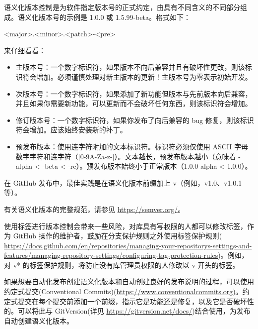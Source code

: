 语义化版本控制是为软件指定版本号的正式约定，由具有不同含义的不同部分组成。语义化版本号的示例是 1.0.0 或 1.5.99-beta。格式如下：

\begin{shell}
<major>.<minor>.<patch>-<pre>
\end{shell}

来仔细看看：

\begin{itemize}
\item 
主版本号：一个数字标识符，如果版本不向后兼容并且有破坏性更改，则该标识符会增加。必须谨慎处理对新主版本的更新！主版本号为零表示初始开发。

\item 
次版本号：一个数字标识符，如果添加了新功能但版本与先前版本向后兼容，并且如果你需要新功能，可以更新而不会破坏任何东西，则该标识符会增加。

\item 
修订版本号：一个数字标识符，如果你发布了向后兼容的 bug 修复，则该标识符会增加。应该始终安装新的补丁。

\item 
预发布版本：使用连字符附加的文本标识符。标识符必须仅使用 ASCII 字母数字字符和连字符（[0-9A-Za-z-]）。文本越长，预发布版本越小（意味着 -alpha < -beta < -rc）。预发布版本始终小于正常版本（1.0.0-alpha < 1.0.0）。
\end{itemize}


在 GitHub 发布中，最佳实践是在语义化版本前缀加上 v（例如，v1.0、v1.0.1 等）。

有关语义化版本的完整规范，请参见 \url{https://semver.org/}。


使用标签进行版本控制会带来一些风险，对库具有写权限的人都可以修改标签，作为 GitHub 操作的维护者，鼓励在分支保护规则之外使用标签保护规则( \url{https://docs.github.com/en/repositories/managing-your-repositorys-settings-and-features/managing-repository-settings/configuring-tag-protection-rules})。例如，对 v* 的标签保护规则，将防止没有库管理员权限的人修改以 v 开头的标签。

如果想要自动化发布创建语义化版本和自动创建良好的发布说明的过程，可以使用约定式提交(Conventional Commits)(\url{https://www.conventionalcommits.org})。约定式提交在每个提交前添加一个前缀，指示它是功能还是修复，以及它是否破坏性的。可以将此与 GitVersion(详见 \url{https://gitversion.net/docs/})结合使用，为发布自动创建语义化版本。